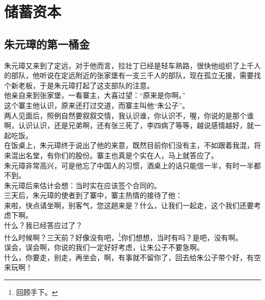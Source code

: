 \section{储蓄资本}
\ifnum{}
	\begin{multicols}{\theparacolNo}
\fi
\subsection{朱元璋的第一桶金}
朱元璋又来到了定远，对于他而言，拉壮丁已经是轻车熟路，很快他组织了上千人的部队，他听说在定远附近的张家堡有一支三千人的部队，现在孤立无援，需要找个新老板，于是朱元璋打起了这支部队的注意。\\

他亲自来到张家堡，一看寨主，大喜过望：“原来是你啊。”\\

这个寨主他认识，原来还打过交道，而寨主叫他“朱公子”。\\

两人见面后，照例自然要叙叙交情，我认识谁，你认识不，喔，你说的是那个谁啊，认识认识，还是兄弟啊，还有张三死了，李四病了等等，越说感情越好，就一起吃饭。\\

在饭桌上，朱元璋终于说出了他的来意，既然目前你们没有主，不如跟着我混，将来混出名堂，有你们的股份。寨主也真是个实在人，马上就答应了。\\

朱元璋非常高兴，可是他忘了中国人的习惯，酒桌上的话只能信一半，有时一半都不到。\\

朱元璋后来估计会想：当时实在应该签个合同的。\\

三天后，朱元璋的使者到了寨中，寨主热情的接待了他：\\

来啦，快点请坐啊，别客气，您这趟来是？什么，让我们一起走，这个我们还要考虑下啊。\\

什么？我已经答应过了？\\

什么时候啊？三天前？好像没有吧，\footnote{回顾手下。}你们想想，当时有吗？是吧，没有啊。\\

误会，误会啊，你说的我们一定好好考虑，让朱公子不要急啊。\\

什么，你要走，别走，再坐会，啊，有事就不留你了，回去给朱公子带个好，有空来玩啊！\\


\end{multicols}
